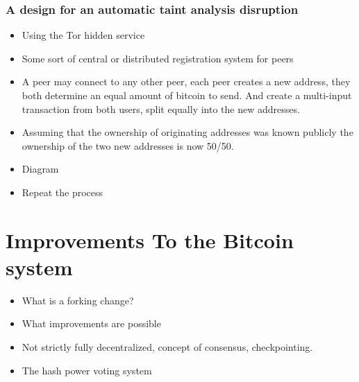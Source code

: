 \subsubsection{A design for an automatic taint analysis disruption}

\begin{itemize} \item Using the Tor hidden service \item Some sort of central or
        distributed registration system for peers \item A peer may connect to
            any other peer, each peer creates a new address, they both determine
            an equal amount of bitcoin to send. And create a multi-input
            transaction from both users, split equally into the new addresses.
\item Assuming that the ownership of originating addresses was known publicly
the ownership of the two new addresses is now 50/50.  \item Diagram \item Repeat
the process \end{itemize}

\section{Improvements To the Bitcoin system}

\begin{itemize} \item What is a forking change?  \item What improvements are
possible \item Not strictly fully decentralized, concept of consensus,
checkpointing.  \item The hash power voting system \end{itemize}


%
%

